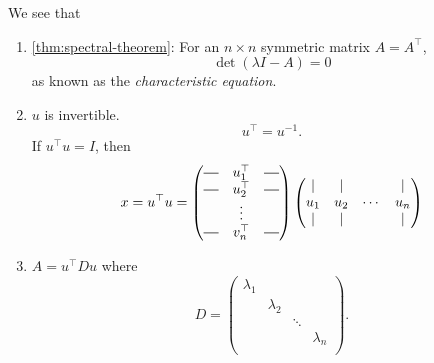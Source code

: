 \newcommand*{\horzbar}{\rule[.5ex]{2.5ex}{0.5pt}}
\begin{prev}
	We see that
	\begin{enumerate}
		\item \autoref{thm:spectral-theorem}: For an \(n\times n\) symmetric matrix \(A = A^{\top}\),
		      \[
			      \det(\lambda I - A) = 0
		      \]
		      as known as the \emph{characteristic equation}.
		\item \(u\) is invertible.
		      \[
			      u^{\top} = u^{-1}.
		      \]
		      If \(u^{\top}u = I\), then
		      \[
			      x = u^{\top}u = \begin{pmatrix}
				      \horzbar & u^{\top}_1 & \horzbar \\
				      \horzbar & u^{\top}_2 & \horzbar \\
				               & \vdots     &          \\
				      \horzbar & v^{\top}_n & \horzbar \\
			      \end{pmatrix}\begin{pmatrix}
				      \mid & \mid &        & \mid \\
				      u_1  & u_2  & \cdots & u_n  \\
				      \mid & \mid &        & \mid \\
			      \end{pmatrix}
		      \]
		\item \(A = u^{\top} D u\)  where \[
			      D  = \begin{pmatrix}
				      \lambda_1 &           &        &           \\
				                & \lambda_2 &        &           \\
				                &           & \ddots &           \\
				                &           &        & \lambda_n \\
			      \end{pmatrix}.
		      \]
	\end{enumerate}
\end{prev}

